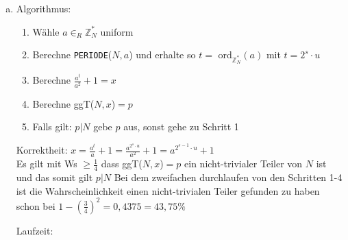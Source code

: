 \documentclass[a4paper]{scrartcl}
\begin{document}
\begin{enumerate}[a)]
\item
Algorithmus:\\
\begin{enumerate}[1.]
\item Wähle $a\in_R \mathbb{Z}_N^*$ uniform
\item Berechne \texttt{PERIODE}($N,a$) und erhalte so $t =$ ord$_{\mathbb{Z}_N^*}(a)$ mit $t=2^s\cdot u$
\item Berechne $\frac{a^t}{a^2}+1=x$
\item Berechne ggT($N, x$)$=p$
\item Falls gilt: $p | N$ gebe $p$ aus, sonst gehe zu Schritt 1
\end{enumerate}

Korrektheit:
$x=\frac{a^t}{a}+1= \frac{a^{2^s\cdot u}}{a^2}+1= a^{2^{s-1}\cdot u}+1$\\
Es gilt mit Ws $\geq \frac{1}{4}$ dass ggT($N, x$)$=p$ ein nicht-trivialer Teiler von $N$ ist und das somit gilt $p|N$
Bei dem zweifachen durchlaufen von den Schritten 1-4 ist die Wahrscheinlichkeit einen nicht-trivialen Teiler gefunden zu haben schon bei $1-(\frac{3}{4})^2=0,4375=43,75 \%$

Laufzeit:



\end{enumerate}
\end{document}
